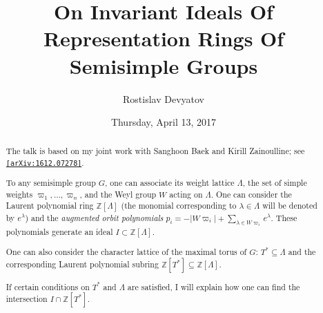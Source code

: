 \documentclass{UAmathtalk}
\author{Rostislav Devyatov}
\title{On Invariant Ideals Of Representation Rings Of Semisimple Groups}
\date{Thursday, April 13, 2017}
\begin{document}
\maketitle

\begin{abstract}
The talk is based on my joint work with Sanghoon Baek and Kirill Zainoulline; see \href{http://www.arxiv.org/abs/1612.07278/}{\texttt{[arXiv:1612.07278]}}.

To any semisimple group $G$, one can associate its weight lattice $\Lambda$, the set of simple weights $\varpi_1,\ldots,\varpi_n$, and the Weyl group $W$ acting on $\Lambda$. One can consider the Laurent polynomial ring $\mathbb{Z}[\Lambda]$ (the monomial corresponding to $\lambda\in\Lambda$ will be denoted by $e^{\lambda}$) and the \emph{augmented orbit polynomials} $p_i=-|W\varpi_i|+\sum_{\lambda\in W\varpi_i}e^{\lambda}$. These polynomials generate an ideal $I\subset\mathbb{Z}[\Lambda]$.

One can also consider the character lattice of the maximal torus of $G$: $T^*\subseteq\Lambda$ and the corresponding Laurent polynomial subring $\mathbb{Z}[T^*]\subseteq\mathbb{Z}[\Lambda]$.

If certain conditions on $T^*$ and $\Lambda$ are satisfied, I will explain how one can find the intersection $I\cap\mathbb{Z}[T^*]$.
\end{abstract}
\end{document}
